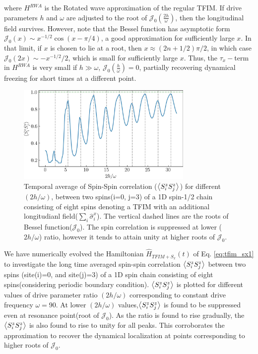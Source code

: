 \documentclass[aps,prb,reprint,showpacs,floatfix,superscriptaddress, onecolumn, nofootinbib, 9pt]{revtex4-2}
\begin{document}
\begin{enumerate}
{where $H^{RWA}$ is the Rotated wave approximation of the regular TFIM. If drive parameters $h$ and $\omega$ are adjusted to the root of $\mathcal{J}_0\left(\frac{2h}{\omega}\right)$, then the longitudinal field survives. However, note that the Bessel function has asymptotic form $\mathcal{J}_0(x)\sim x^{-1/2}\cos(x-\pi/4)$, a good approximation for sufficiently  large $x$. In that limit, if $x$ is chosen to lie at a root, then $x\approx (2n+1/2)\pi/2$, in which case $\mathcal{J}_0(2x) \sim -x^{-1/2}/2$, which is small for sufficiently large $x$. Thus, the $\tau_x-$term in $H^{RWA}$ is very small if $h\gg\omega$, $\mathcal{J}_0\left(\frac{h}{\omega}\right)=0$, partially recovering dynamical freezing for short times at a different point.

\begin{figure}[h!]
	\includegraphics[width=8.5cm]{corrN8sz0sz3avg_onlynn_tfim_sx.jpeg}
	\caption{Temporal average of Spin-Spin correlation ($\expval{S^z_i S^z_j}$) for different $(2h/\omega)$, between two spins(i=0, j=3) of a 1D spin-1/2 chain consisting of eight spins denoting a TFIM with an additional longitudianl field($\sum_i\hat{\sigma}^x_i$).  The  vertical dashed lines are the roots of Bessel function($\mathcal{J}_0$). The spin correlation is suppressed at lower ($2h/\omega$) ratio, however it tends to attain unity at higher roots of $\mathcal{J}_0$.}
	\label{fig:TFIM_sx}
\end{figure}

We have numerically evolved the Hamiltonian $\hat{H}_{TFIM+S_x}(t)$ of Eq. \eqref{eq:tfim_sx1} to investigate the long time averaged spin-spin correlation $\expval{S^z_i S^z_{j}}$ between two spins (site(i)=0, and site(j)=3) of a 1D spin chain consisting of eight spins(considering periodic boundary condition).  $\expval{S^z_i S^z_{j}}$ is plotted for different values of drive parameter ratio $(2h/\omega)$ corresponding to constant drive frequency $\omega=90$. At lower $(2h/\omega)$ values,$\expval{S^z_i S^z_{j}}$ is found to be suppressed even at resonance point(root of $\mathcal{J}_0$). As the ratio is found to rise gradually, the $\expval{S^z_i S^z_{j}}$ is also found to rise to unity for all peaks. This corroborates the approximation to recover the dynamical localization at points corresponding to higher roots of $\mathcal{J}_0$.
}


\end{enumerate}
\end{document}

